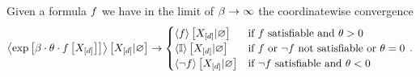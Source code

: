 \begin{lemma}\label{lem:localHardLimit}
	Given a formula $f$ we have in the limit of $\beta\rightarrow\infty$ the coordinatewise convergence
	\begin{align*}
		\left\langle \mathrm{exp}\left[\beta\cdot\theta\cdot f\left[X_{[d]}\right]\right]\right\rangle \left[ X_{[d]} | \varnothing \right] \rightarrow
		\begin{cases}
			\left\langle f\right\rangle \left[ X_{[d]} | \varnothing \right] & \text{if $f$ satisfiable and } \theta>0\\
			\left\langle \mathbb{I}\right\rangle \left[ X_{[d]} | \varnothing \right] & \text{if $f$ or $\lnot f$ not satisfiable or } \theta=0 \\
			\left\langle \lnot f\right\rangle \left[ X_{[d]} | \varnothing \right] & \text{if $\lnot f$ satisfiable and } \theta<0\\
		\end{cases} \, .
	\end{align*}
\end{lemma}

